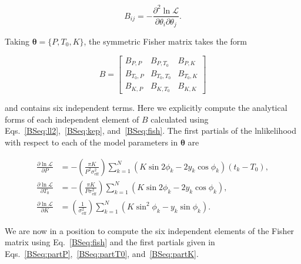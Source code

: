 \begin{equation}
  B_{ij} = -\frac{\partial^2 \ln{\mathcal{L}}}{\partial \theta_i \partial \theta_j}.
  \label{BSeq:fish}
\end{equation}

\noindent Taking $\boldsymbol{\theta}=\{P,T_0,K\}$, the symmetric Fisher matrix takes the
form

\begin{equation}
  B =
 \begin{bmatrix}
   B_{P,P} & B_{P,T_0} & B_{P,K} \\
   B_{T_0,P} & B_{T_0,T_0} & B_{T_0,K} \\
   B_{K,P} & B_{K,T_0} & B_{K,K} 
 \end{bmatrix} \label{BSeq:B}
\end{equation}

\noindent and contains six independent terms.
Here we explicitly compute the analytical forms of each independent element of $B$
calculated using Eqs.~\ref{BSeq:ll2},~\ref{BSeq:kep}, and~\ref{BSeq:fish}. The first partials
of the lnlikelihood with respect to each of the model parameters in $\boldsymbol{\theta}$ are

\begin{align}
  \frac{\partial \ln{\mathcal{L}}}{\partial P} &=
  -\left( \frac{\pi K}{P^2 \sigma_{\text{eff}}^2} \right) \sum_{k=1}^{N} (K \sin{2\phi_k} - 2y_k \cos{\phi_k}) (t_k-T_0), \label{BSeq:partP} \\
  \frac{\partial \ln{\mathcal{L}}}{\partial T_0} &=
  -\left( \frac{\pi K}{P \sigma_{\text{eff}}^2} \right) \sum_{k=1}^{N} (K \sin{2\phi_k} - 2y_k \cos{\phi_k}), \label{BSeq:partT0} \\
  \frac{\partial \ln{\mathcal{L}}}{\partial K} &=
  \left( \frac{1}{\sigma_{\text{eff}}^2} \right) \sum_{k=1}^{N} \left( K\sin^2{\phi_k} - y_k\sin{\phi_k}  \right). \label{BSeq:partK}
\end{align}

\noindent We are now in a position to compute the six independent elements of the Fisher matrix using Eq.~\ref{BSeq:fish}
and the first partials given in Eqs.~\ref{BSeq:partP},~\ref{BSeq:partT0}, and~\ref{BSeq:partK}.

